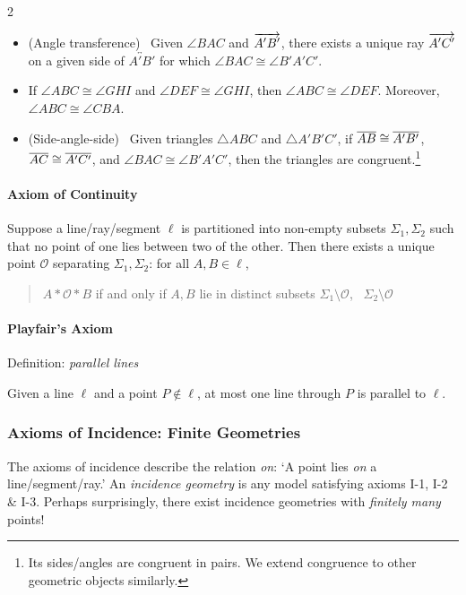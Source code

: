 \begin{multicols}{2}
	\begin{itemize}\itemsep2pt
	  \item[C-4] (Angle transference) \ Given $\angle BAC$ and $\overrightarrow{A'B'}$, there exists a unique ray $\overrightarrow{A'C'}$ on a given side of $\overleftrightarrow{A'B'}$ for which $\angle BAC\cong\angle B'A'C'$.
	  \item[C-5] If $\angle ABC\cong\angle GHI$ and $\angle DEF\cong\angle GHI$, then $\angle ABC\cong\angle DEF$. Moreover, $\angle ABC\cong\angle CBA$.
	  \item[C-6] (Side-angle-side) \ Given triangles $\triangle ABC$ and $\triangle A'B'C'$, if $\overline{AB}\cong\overline{A'B'}$, $\overline{AC}\cong\overline{A'C'}$, and $\angle BAC\cong\angle B'A'C'$, then the triangles are congruent.\footnote{%
	Its sides/angles are congruent in pairs. We extend congruence to other geometric objects similarly.%
}
	\end{itemize}
	
	
	\paragraph{Axiom of Continuity}
	
	Suppose a line/ray/segment $\ell$ is partitioned into non-empty subsets $\Sigma_1,\Sigma_2$ such that no point of one lies between two of the other. Then there exists a unique point $\mathcal O$ separating $\Sigma_1,\Sigma_2$:
	for all $A,B\in\ell$,
	\begin{quote}
		$A*\mathcal O*B$ if and only if $A,B$ lie in distinct subsets $\Sigma_1\setminus\mathcal O$, \ $\Sigma_2\setminus\mathcal O$
	\end{quote}
	
	
	\paragraph{Playfair's Axiom}
	
	Definition: \emph{parallel lines}\smallbreak
	
	Given a line $\ell$ and a point $P\notin\ell$, at most one line through $P$ is parallel to $\ell$.
\end{multicols}


\clearpage


\subsubsection*{Axioms of Incidence: Finite Geometries}

The axioms of incidence describe the relation \emph{on}: `A point lies \emph{on} a line/segment/ray.' An \emph{incidence geometry} is any model satisfying axioms I-1, I-2 \& I-3. Perhaps surprisingly, there exist incidence geometries with \emph{finitely many} points!


